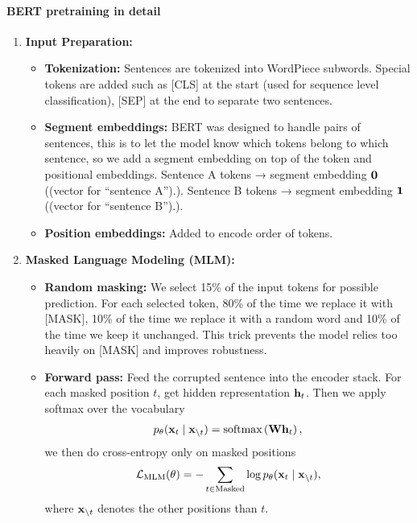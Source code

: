 \documentclass[11pt]{article}  %
\begin{document}
\paragraph{BERT pretraining in detail}
\begin{enumerate}
  \item \textbf{Input Preparation:} 
  \begin{itemize}
    \item \textbf{Tokenization:} Sentences are tokenized into WordPiece subwords.
    Special tokens are added such as [CLS] at the start (used for sequence level classification), [SEP] at the end to separate two sentences.

    \item \textbf{Segment embeddings:} BERT was designed to handle pairs of sentences, this is to let the model know which tokens belong to which sentence, so we add a segment embedding on top of the token and positional embeddings. Sentence A tokens → segment embedding ${\bf 0}$ ((vector for ``sentence A'').). Sentence B tokens → segment embedding ${\bf 1}$ ((vector for ``sentence B'').).
    
    \item \textbf{Position embeddings:} Added to encode order of tokens.
  \end{itemize}  

  \item \textbf{Masked Language Modeling (MLM):}
  \begin{itemize}
    \item \textbf{Random masking:} We select 15\% of the input tokens for possible prediction. 
    For each selected token, 80\% of the time we replace it with [MASK], 10\% of the time we replace it with a random word and 10\% of the time we keep it unchanged.
    This trick prevents the model relies too heavily on [MASK] and improves robustness.

    \item \textbf{Forward pass:} Feed the corrupted sentence into the encoder stack. 
    For each masked position $t$, get hidden representation $\mathbf{h}_t$. 
    Then we apply softmax over the vocabulary 
    \begin{align*}
      p_{\theta}(\mathbf{x}_t \mid \mathbf{x}_{\backslash t}) = \text{softmax} \left( \mathbf{W} \mathbf{h}_t \right),
    \end{align*}
    we then do cross-entropy only on masked positions 
    \begin{align*}
      \mathcal{L}_{\text{MLM}}(\theta) = - \sum_{t \in \text{Masked}}\log p_\theta (\mathbf{x}_t \mid \mathbf{x}_{\backslash t}),
    \end{align*}
    where $\mathbf{x}_{\backslash t}$ denotes the other positions than $t$.
  \end{itemize}


\end{enumerate}
\end{document}
